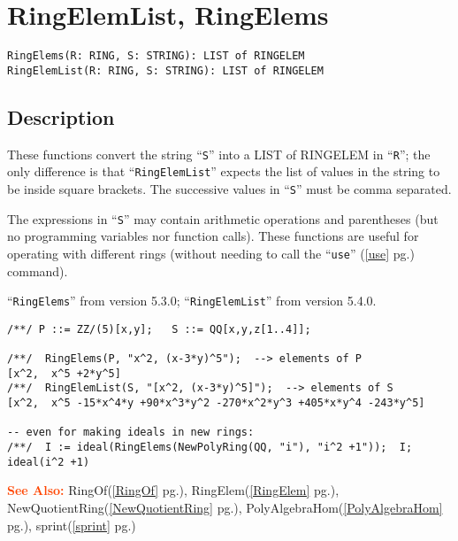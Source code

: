 \documentclass[a4paper]{mybook}
\newenvironment{command}{}{} %
\newcommand\SeeAlso{\par\textcolor{OrangeRed}{\textbf{\large See Also: }}}
\begin{document}
\section{RingElemList, RingElems}
\label{RingElemList, RingElems}
\begin{command} %


\begin{Verbatim}[label=syntax, rulecolor=\color{MidnightBlue},
frame=single]
RingElems(R: RING, S: STRING): LIST of RINGELEM
RingElemList(R: RING, S: STRING): LIST of RINGELEM
\end{Verbatim}


\subsection*{Description}

These functions convert the string ``\verb&S&'' into a LIST of RINGELEM in ``\verb&R&'';
the only difference is that ``\verb&RingElemList&'' expects the list of values
in the string to be inside square brackets.  The successive values in ``\verb&S&''
must be comma separated.
\par 
The expressions in ``\verb&S&'' may contain arithmetic operations and parentheses
(but no programming variables nor function calls).  These functions are
useful for operating with different rings (without needing to call the
``\verb&use&'' (\ref{use} pg.\pageref{use}) command).
\par 
``\verb&RingElems&'' from version 5.3.0; ``\verb&RingElemList&'' from version 5.4.0.
\begin{Verbatim}[label=example, rulecolor=\color{PineGreen}, frame=single]
/**/ P ::= ZZ/(5)[x,y];   S ::= QQ[x,y,z[1..4]];

/**/  RingElems(P, "x^2, (x-3*y)^5");  --> elements of P
[x^2,  x^5 +2*y^5]
/**/  RingElemList(S, "[x^2, (x-3*y)^5]");  --> elements of S
[x^2,  x^5 -15*x^4*y +90*x^3*y^2 -270*x^2*y^3 +405*x*y^4 -243*y^5]

-- even for making ideals in new rings:
/**/  I := ideal(RingElems(NewPolyRing(QQ, "i"), "i^2 +1"));  I;
ideal(i^2 +1)
\end{Verbatim}


\SeeAlso %
  RingOf(\ref{RingOf} pg.\pageref{RingOf}), 
    RingElem(\ref{RingElem} pg.\pageref{RingElem}), 
    NewQuotientRing(\ref{NewQuotientRing} pg.\pageref{NewQuotientRing}), 
    PolyAlgebraHom(\ref{PolyAlgebraHom} pg.\pageref{PolyAlgebraHom}), 
    sprint(\ref{sprint} pg.\pageref{sprint})
\end{command} %
\end{document}
